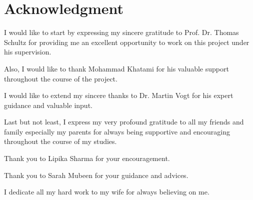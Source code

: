 \documentclass[../structure.tex]{subfiles}
\begin{document}
\chapter*{Acknowledgment}

I would like to start by expressing my sincere gratitude to Prof. Dr. Thomas Schultz 
for providing me an excellent opportunity to work on this project under his supervision.

Also, I would like to thank Mohammad Khatami for his valuable support throughout the course of the project.

I would like to extend my sincere thanks to Dr. Martin Vogt for his expert guidance and valuable input.

Last but not least, I express my very profound gratitude to all my friends
and family especially my parents for always being supportive and encouraging throughout the course of my studies.

Thank you to Lipika Sharma for your encouragement.

Thank you to Sarah Mubeen for your guidance and advices.

I dedicate all my hard work to my wife for always believing on me.
\end{document}
